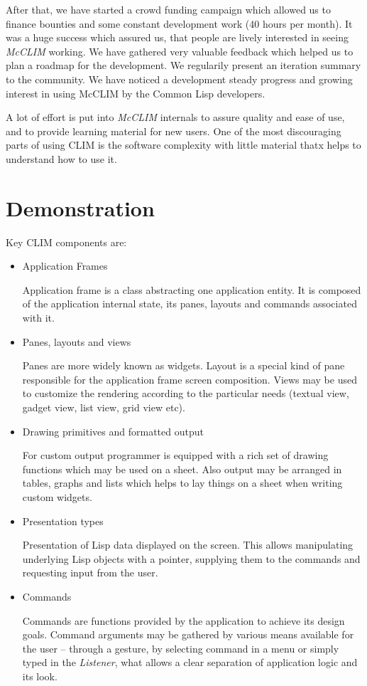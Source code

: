 \documentclass{sig-alternate-05-2015}
\begin{document}
After that, we have started a crowd funding campaign which allowed us
to finance bounties and some constant development work (40 hours per
month). It was a huge success which assured us, that people are lively
interested in seeing \emph{McCLIM} working. We have gathered very
valuable feedback which helped us to plan a roadmap\cite{roadmap} for
the development. We regularily present an iteration summary to the
community. We have noticed a development steady progress and growing
interest in using McCLIM by the Common Lisp developers.

A lot of effort is put into \emph{McCLIM} internals to assure quality
and ease of use, and to provide learning material for new users. One
of the most discouraging parts of using CLIM is the software
complexity with little material\cite{guided} thatx helps to understand
how to use it.
\section{Demonstration}

Key CLIM components are:

\begin{itemize}
\item Application Frames

  Application frame is a class abstracting one application entity. It
  is composed of the application internal state, its panes, layouts
  and commands associated with it.

\item Panes, layouts and views

  Panes are more widely known as widgets. Layout is a special kind of
  pane responsible for the application frame screen composition. Views
  may be used to customize the rendering according to the particular
  needs (textual view, gadget view, list view, grid view etc).

\item Drawing primitives and formatted output

  For custom output programmer is equipped with a rich set of drawing
  functions which may be used on a sheet. Also output may be arranged
  in tables, graphs and lists which helps to lay things on a sheet
  when writing custom widgets.

\item Presentation types

  Presentation of Lisp data displayed on the screen. This allows
  manipulating underlying Lisp objects with a pointer, supplying them
  to the commands and requesting input from the user.

\item Commands

  Commands are functions provided by the application to achieve its
  design goals. Command arguments may be gathered by various means
  available for the user – through a gesture, by selecting command in
  a menu or simply typed in the \emph{Listener}\cite{listener}, what
  allows a clear separation of application logic and its look.
\end{itemize}
\end{document}
